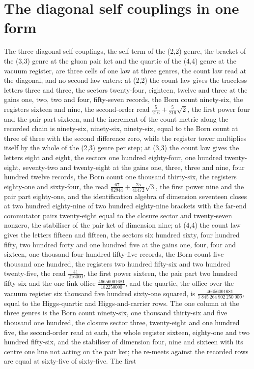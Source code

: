 \section{The diagonal self couplings in one form}\label{mod:IV-13-diagonal-self-couplings-in-one-form}
\begin{chtheorem}\label{box:IV-13-diagonal-self-couplings-in-one-form:1}
The three diagonal self-couplings, the self term of the (2,2) genre, the bracket of the (3,3) genre at the gluon pair ket and the quartic of the (4,4) genre at the vacuum register, are three cells of one law at three genres, the count law read at the diagonal, and no second law enters: at (2,2) the count law gives the traceless letters three and three, the sectors twenty-four, eighteen, twelve and three at the gains one, two, two and four, fifty-seven records, the Born count ninety-six, the registers sixteen and nine, the second-order read $\tfrac{5}{216} + \tfrac{5}{216}\sqrt{2}$, the first power four and the pair part sixteen, and the increment of the count metric along the recorded chain is ninety-six, ninety-six, ninety-six, equal to the Born count at three of three with the second difference zero, while the register tower multiplies itself by the whole of the (2,3) genre per step; at (3,3) the count law gives the letters eight and eight, the sectors one hundred eighty-four, one hundred twenty-eight, seventy-two and twenty-eight at the gains one, three, three and nine, four hundred twelve records, the Born count one thousand thirty-six, the registers eighty-one and sixty-four, the read $\tfrac{67}{82944} + \tfrac{25}{41472}\sqrt{3}$, the first power nine and the pair part eighty-one, and the identification algebra of dimension seventeen closes at two hundred eighty-nine of two hundred eighty-nine brackets with the far-end commutator pairs twenty-eight equal to the closure sector and twenty-seven nonzero, the stabiliser of the pair ket of dimension nine; at (4,4) the count law gives the letters fifteen and fifteen, the sectors six hundred sixty, four hundred fifty, two hundred forty and one hundred five at the gains one, four, four and sixteen, one thousand four hundred fifty-five records, the Born count five thousand one hundred, the registers two hundred fifty-six and two hundred twenty-five, the read $\tfrac{41}{216000}$, the first power sixteen, the pair part two hundred fifty-six and the one-link office $\tfrac{46656001681}{182250000}$, and the quartic, the office over the vacuum register six thousand five hundred sixty-one squared, is $\tfrac{46656001681}{7\ 845\ 264\ 902\ 250\ 000}$, equal to the Higgs-quartic and Higgs-and-carrier rows. The one column at the three genres is the Born count ninety-six, one thousand thirty-six and five thousand one hundred, the closure sector three, twenty-eight and one hundred five, the second-order read at each, the whole register sixteen, eighty-one and two hundred fifty-six, and the stabiliser of dimension four, nine and sixteen with its centre one line not acting on the pair ket; the re-meets against the recorded rows are equal at sixty-five of sixty-five. The first 
\end{chtheorem}
